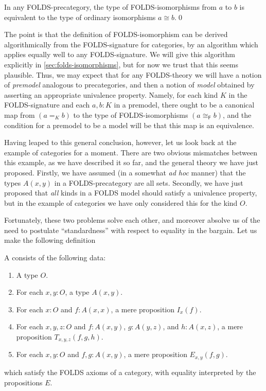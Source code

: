 \documentclass{amsart}
\newcommand{\fiso}{\cong_{\textsf{F}}}
\begin{document}
\begin{thm}
  In any FOLDS-precategory, the type of FOLDS-isomorphisms from $a$ to $b$ is equivalent to the type of ordinary isomorphisms $a\cong b$.\qed
\end{thm}

The point is that the definition of FOLDS-isomorphism can be derived algorithmically from the FOLDS-signature for categories, by an algorithm which applies equally well to any FOLDS-signature.
We will give this algorithm explicitly in \autoref{sec:folds-isomorphisms}, but for now we trust that this seems plausible.
Thus, we may expect that for any FOLDS-theory we will have a notion of \emph{premodel} analogous to precategories, and then a notion of \emph{model} obtained by asserting an appropriate univalence property.
Namely, for each kind $K$ in the FOLDS-signature and each $a,b:K$ in a premodel, there ought to be a canonical map from $(a=_K b)$ to the type of FOLDS-isomorphisms $(a\fiso b)$, and the condition for a premodel to be a model will be that this map is an equivalence.

Having leaped to this general conclusion, however, let us look back at the example of categories for a moment.
There are two obvious mismatches between this example, as we have described it so far, and the general theory we have just proposed.
Firstly, we have assumed (in a somewhat \textit{ad hoc} manner) that the types $A(x,y)$ in a FOLDS-precategory are all sets.
Secondly, we have just proposed that \emph{all} kinds in a FOLDS model should satisfy a univalence property, but in the example of categories we have only considered this for the kind $O$.

Fortunately, these two problems solve each other, and moreover absolve us of the need to postulate ``standardness'' with respect to equality in the bargain.
Let us make the following definition

\begin{defn}
  A \textbf{} consists of the following data:
  \begin{enumerate}
  \item A type $O$.
  \item For each $x,y:O$, a type $A(x,y)$.
  \item For each $x:O$ and $f:A(x,x)$, a mere proposition $I_x(f)$.
  \item For each $x,y,z:O$ and $f:A(x,y)$, $g:A(y,z)$, and $h:A(x,z)$, a mere proposition $T_{x,y,z}(f,g,h)$.
  \item For each $x,y:O$ and $f,g:A(x,y)$, a mere proposition $E_{x,y}(f,g)$.
  \end{enumerate}
  which satisfy the FOLDS axioms of a category, with equality interpreted by the propositions $E$.
\end{defn}
\end{document}
